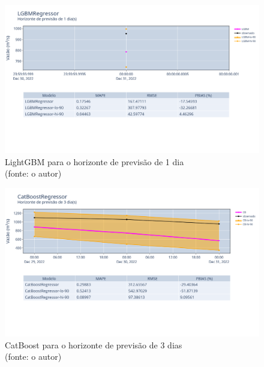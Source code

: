 \begin{figure}[!h]
	\centering
	\includegraphics[scale=0.33]{Figuras/jequiti/resultados/LGBMRegressor_fh1.png}
	\caption{LightGBM para o horizonte de previsão de 1 dia\\(fonte: o autor)}
	\label{fig:jequiti_LGBMRegressor_fh1}
\end{figure}

\begin{figure}[!h]
	\centering
	\includegraphics[scale=0.33]{Figuras/jequiti/resultados/CatBoostRegressor_fh3.png}
	\caption{CatBoost para o horizonte de previsão de 3 dias\\(fonte: o autor)}
	\label{fig:jequiti_CatBoostRegressor_fh3}
\end{figure}

